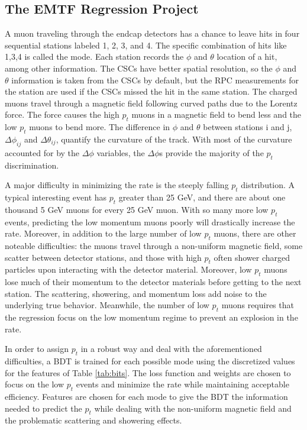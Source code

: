 \subsection{The EMTF Regression Project}

A muon traveling through the endcap detectors has a chance to leave hits in four sequential stations labeled 1, 2, 3, and 4. The specific combination of hits like 1,3,4 is called the mode. Each station records the $\phi$ and $\theta$ location of a hit, among other information. The CSCs have better spatial resolution, so the $\phi$ and $\theta$ information is taken from the CSCs by default, but the RPC measurements for the station are used if the CSCs missed the hit in the same station. The charged muons travel through a magnetic field following curved paths due to the Lorentz force. The force causes the high $p_t$ muons in a magnetic field to bend less and the low $p_t$ muons to bend more. The difference in $\phi$ and $\theta$ between stations i and j, $\Delta\phi_{ij}$ and $\Delta\theta_{ij}$, quantify the curvature of the track. With most of the curvature accounted for by the $\Delta\phi$ variables, the $\Delta\phi$s provide the majority of the $p_t$ discrimination.

A major difficulty in minimizing the rate is the steeply falling $p_t$ distribution. A typical interesting event has $p_t$ greater than 25 GeV, and there are about one thousand 5 GeV muons for every 25 GeV muon. With so many more low $p_t$ events, predicting the low momentum muons poorly will drastically increase the rate. Moreover, in addition to the large number of low $p_t$ muons, there are other noteable difficulties: the muons travel through a non-uniform magnetic field, some scatter between detector stations, and those with high $p_t$ often shower charged particles upon interacting with the detector material. Moreover, low $p_t$ muons lose much of their momentum to the detector materials before getting to the next station. The scattering, showering, and momentum loss add noise to the underlying true behavior. Meanwhile, the number of low $p_t$ muons requires that the regression focus on the low momentum regime to prevent an explosion in the rate.

In order to assign $p_t$ in a robust way and deal with the aforementioned difficulties, a BDT is trained for each possible mode using the discretized values for the features of Table \ref{tab:bits}. The loss function and weights are chosen to focus on the low $p_t$ events and minimize the rate while maintaining acceptable efficiency. Features are chosen for each mode to give the BDT the information needed to predict the $p_t$ while dealing with the non-uniform magnetic field and the problematic scattering and showering effects.

